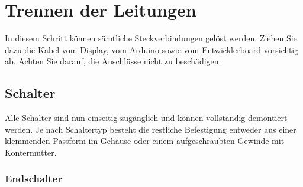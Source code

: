 \chapter{Trennen der Leitungen}
In diesem Schritt können sämtliche Steckverbindungen gelöst werden. Ziehen Sie dazu die Kabel vom Display, vom Arduino sowie vom Entwicklerboard vorsichtig ab. Achten Sie darauf, die Anschlüsse nicht zu beschädigen.

\section{Schalter}
Alle Schalter sind nun einseitig zugänglich und können vollständig demontiert werden. Je nach Schaltertyp besteht die restliche Befestigung entweder aus einer klemmenden Passform im Gehäuse oder einem aufgeschraubten Gewinde mit Kontermutter.

\subsection{Endschalter}


